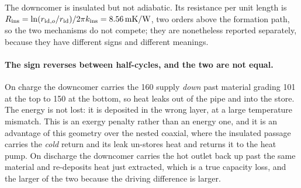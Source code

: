 The downcomer is insulated but not adiabatic. Its resistance per unit length
is $R_{\mathrm{ins}} = \ln(r_{\mathrm{id},o}/\rid)/2\pi k_{\mathrm{ins}}
= \SI{8.56}{\metre\kelvin\per\watt}$, two orders above the formation path, so
the two mechanisms do not compete; they are nonetheless reported separately,
because they have different signs and different meanings.

\paragraph{The sign reverses between half-cycles, and the two are not equal.}
On charge the downcomer carries the \SI{160}{\degC} supply \emph{down} past
material grading \SI{101}{\degC} at the top to \SI{150}{\degC} at the bottom,
so heat leaks out of the pipe and into the store. The energy is not lost: it
is deposited in the wrong layer, at a large temperature mismatch. This is an
exergy penalty rather than an energy one, and it is an advantage of this
geometry over the nested coaxial, where the insulated passage carries the
\emph{cold} return and its leak un-stores heat and returns it to the heat
pump. On discharge the downcomer carries the hot outlet back up past the same
material and re-deposits heat just extracted, which is a true capacity loss,
and the larger of the two because the driving difference is larger.

